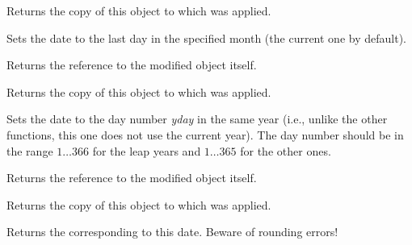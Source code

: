 Returns the copy of this object to which 
 was applied.

\label{wxdatetimesettolastmonthday}


Sets the date to the last day in the specified month (the current one by
default).

Returns the reference to the modified object itself.

\label{wxdatetimegetlastmonthday}


Returns the copy of this object to which 
 was applied.

\label{wxdatetimesettoyearday}


Sets the date to the day number {\it yday} in the same year (i.e., unlike the
other functions, this one does not use the current year). The day number
should be in the range $1\ldots366$ for the leap years and $1\ldots365$ for
the other ones.

Returns the reference to the modified object itself.

\label{wxdatetimegetyearday}


Returns the copy of this object to which 
 was applied.


\label{wxdatetimegetjuliandaynumber}


Returns the  corresponding to this date. Beware
of rounding errors!



